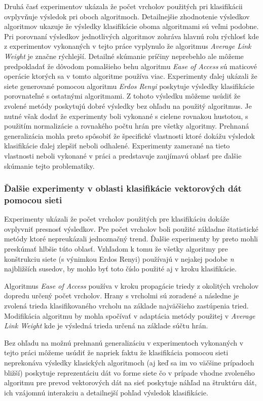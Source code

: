\documentclass[slovak,master,dept460,male,cpp,cpdeclaration]{diploma}
\begin{document}
Druhá časť experimentov ukázala že počet vrcholov použitých pri klasifikácii ovplyvňuje výsledok pri oboch algoritmoch. Detailnejšie zhodnotenie výsledkov algoritmov ukazuje že výsledky klasifikácie oboma algoritmami sú veľmi podobne. Pri porovnaní výsledkov jednotlivých algoritmov zohráva hlavnú rolu rýchlosť kde z experimentov vykonaných v tejto práce vyplynulo že algoritmus \textit{Average Link Weight} je značne rýchlejší.  Detailné skúmanie príčiny neprebehlo ale môžeme predpokladať že dôvodom pomalšieho behu algoritmu \textit{Ease of Access} sú maticové operácie ktorých sa v tomto algoritme používa viac. Experimenty ďalej ukázali že siete generované pomocou algoritmu \textit{Erdos Renyi} poskytuje výsledky klasifikácie porovnateľné s ostatnými algoritmami. Z tohoto výsledku môžeme usúdiť že zvolené metódy poskytujú dobré výsledky bez ohľadu na použitý algoritmus. Je nutné však dodať že experimenty boli vykonané s cielene rovnakou hustotou, s použitím normalizácie a rovnakého počtu hrán pre všetky algoritmy. Prehnaná generalizácia mohla preto spôsobiť že špecifické vlastnosti ktoré dokážu výsledok klasifikácie ďalej zlepšiť neboli odhalené. Experimenty zamerané na tieto vlastnosti neboli vykonané v práci a predstavuje zaujímavú oblasť pre ďalšie skúmanie tejto problematiky.

\subsubsection{Ďalšie experimenty v oblasti klasifikácie vektorových dát pomocou sieti}
Experimenty ukázali že počet vrcholov použitých pre klasifikáciu dokáže ovplyvniť presnosť výsledkov. Pre počet vrcholov boli použité základne štatistické metódy ktoré nepreukázali jednoznačný trend. Ďalšie experimenty by preto mohli preskúmať hlbšie túto oblasť. Vzhľadom k tomu že všetky algoritmy pre konštrukciu siete (s výnimkou Erdos Renyi) používajú v nejakej podobe \textit{n} najbližších susedov, by mohlo byť toto číslo použité aj v kroku  klasifikácie.

Algoritmus \textit{Ease of Access} používa v kroku propagácie triedy z okolitých vrcholov dopredu určený počet vrcholov. Hrany s vrcholmi sú zoradené a následne je zvolená trieda klasifikovaného vrcholu na základe najväčšieho zastúpenia tried. Modifikácia algoritmu by mohla spočívať v adaptácia metódy použitej v \textit{Average Link Weight} kde je výsledná trieda určená na základe súčtu hrán.

Bez ohľadu na možnú prehnanú generalizáciu v experimentoch vykonaných v tejto práci môžeme usúdiť že napriek faktu že klasifikácia pomocou sieti neprekonáva výsledky klasických algoritmoch (aj keď sa im vo väčšine prípadoch bližší) poskytuje reprezentáciu dát vo forme siete čo v prípade vhodne zvoleného algoritmu pre prevod vektorových dát na sieť poskytuje náhľad na štruktúru dát, ich vzájomnú interakciu a detailnejší pohľad výsledok klasifikácie.
\end{document}

